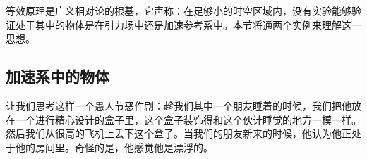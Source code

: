 
等效原理是广义相对论的根基，它声称：在足够小的时空区域内，没有实验能够验证处于其中的物体是在引力场中还是加速参考系中。本节将通两个实例来理解这一思想。

\subsection{加速系中的物体}
让我们思考这样一个愚人节恶作剧：趁我们其中一个朋友睡着的时候，我们把他放在一个进行精心设计的盒子里，这个盒子装饰得和这个伙计睡觉的地方一模一样。然后我们从很高的飞机上丢下这个盒子。当我们的朋友新来的时候，他认为他正处于他的房间里。奇怪的是，他感觉他是漂浮的。